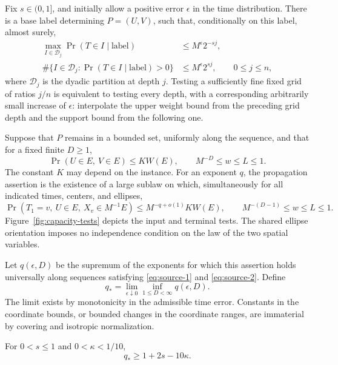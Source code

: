 Fix \(s\in(0,1]\), and initially allow a positive error \(\epsilon\)
in the time distribution.  There is a base label determining
\(P=(U,V)\), such that, conditionally on this label, almost surely,
\begin{equation}\label{eq:source-1}
\begin{split}
\max_{I\in\mathcal D_j}
 \Pr(T\in I\mid\text{label})
 &\le M^\epsilon 2^{-sj},\\
\#\{I\in\mathcal D_j:
 \Pr(T\in I\mid\text{label})>0\}
 &\le M^\epsilon 2^{sj},
\qquad 0\le j\le n,
\end{split}
\end{equation}
where \(\mathcal D_j\) is the dyadic partition at depth \(j\).
Testing a sufficiently fine fixed grid of ratios \(j/n\) is
equivalent to testing every depth, with a corresponding arbitrarily
small increase of \(\epsilon\): interpolate the upper weight bound
from the preceding grid depth and the support bound from the
following one.

Suppose that \(P\) remains in a bounded set, uniformly along the
sequence, and that for a fixed finite \(D\ge1\),
\begin{equation}\label{eq:source-2}
\Pr(U\in E,\ V\in E)\le K W(E),
\qquad M^{-D}\le w\le L\le1.
\end{equation}
The constant \(K\) may depend on the instance.  For an exponent \(q\),
the propagation assertion is the existence of a large sublaw on
which, simultaneously for all indicated times, centers, and ellipses,
\begin{equation}\label{eq:source-3}
\Pr(T_1=v,\ U\in E,\ X_v\in M^{-1}E)
\le M^{-q+o(1)}K W(E),
\qquad M^{-(D-1)}\le w\le L\le1.
\end{equation}
Figure~\ref{fig:capacity-tests} depicts the input and terminal
tests.  The shared ellipse orientation imposes no independence
condition on the law of the two spatial variables.


Let \(q(\epsilon,D)\) be the supremum of the exponents for which this
assertion holds universally along sequences satisfying
\eqref{eq:source-1} and \eqref{eq:source-2}.  Define
\[
q_*=\lim_{\epsilon\downarrow0}\inf_{1\le D<\infty}q(\epsilon,D).
\]
The limit exists by monotonicity in the admissible time error.
Constants in the coordinate bounds, or bounded changes in the
coordinate ranges, are immaterial by covering and isotropic
normalization.

\begin{theorem}\label{geo:main}
For \(0<s\le1\) and \(0<\kappa<1/10\),
\begin{equation}\label{eq:source-4}
q_*\ge1+2s-10\kappa.
\end{equation}
\end{theorem}

